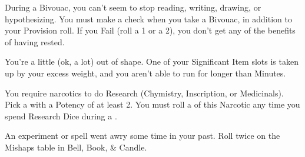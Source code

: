 {  

  During a Bivouac, you can't seem to stop reading, writing, drawing, or hypothesizing.  You must make a \RS \FOC check when you take a Bivouac, in addition to your Provision roll.  If you Fail (roll a 1 or a 2), you don't get any of the benefits of having rested.


  You're a little (ok, a lot) out of shape.  One of your Significant Item slots is taken up by your excess weight, and you aren't able to run for longer than Minutes.


  You require narcotics to do Research (Chymistry, Inscription, or Medicinals).  Pick a  with a Potency of at least 2.  You must roll a \UD of this Narcotic any time you spend Research Dice during a .



  An experiment or spell went awry some time in your past.  Roll twice on the Mishaps table in Bell, Book, \& Candle.

\newpage





\cbreak








}
